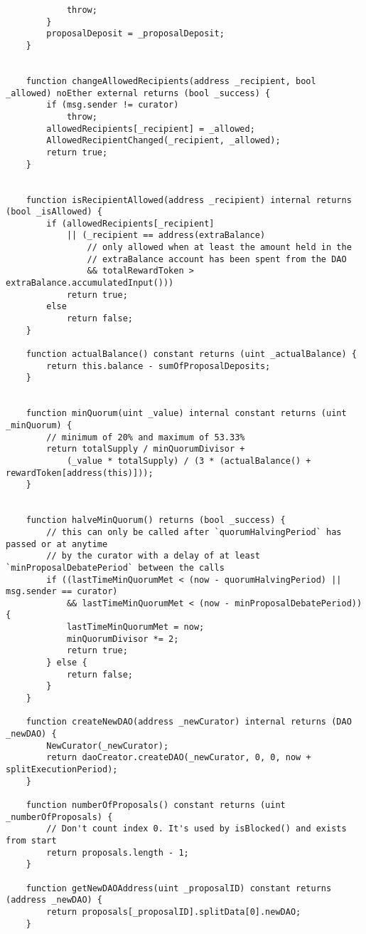 \documentclass[9pt,oneside]{amsart}
\begin{document}
\begin{appendix}
\begin{verbatim}
            throw;
        }
        proposalDeposit = _proposalDeposit;
    }


    function changeAllowedRecipients(address _recipient, bool _allowed) noEther external returns (bool _success) {
        if (msg.sender != curator)
            throw;
        allowedRecipients[_recipient] = _allowed;
        AllowedRecipientChanged(_recipient, _allowed);
        return true;
    }


    function isRecipientAllowed(address _recipient) internal returns (bool _isAllowed) {
        if (allowedRecipients[_recipient]
            || (_recipient == address(extraBalance)
                // only allowed when at least the amount held in the
                // extraBalance account has been spent from the DAO
                && totalRewardToken > extraBalance.accumulatedInput()))
            return true;
        else
            return false;
    }

    function actualBalance() constant returns (uint _actualBalance) {
        return this.balance - sumOfProposalDeposits;
    }


    function minQuorum(uint _value) internal constant returns (uint _minQuorum) {
        // minimum of 20% and maximum of 53.33%
        return totalSupply / minQuorumDivisor +
            (_value * totalSupply) / (3 * (actualBalance() + rewardToken[address(this)]));
    }


    function halveMinQuorum() returns (bool _success) {
        // this can only be called after `quorumHalvingPeriod` has passed or at anytime
        // by the curator with a delay of at least `minProposalDebatePeriod` between the calls
        if ((lastTimeMinQuorumMet < (now - quorumHalvingPeriod) || msg.sender == curator)
            && lastTimeMinQuorumMet < (now - minProposalDebatePeriod)) {
            lastTimeMinQuorumMet = now;
            minQuorumDivisor *= 2;
            return true;
        } else {
            return false;
        }
    }

    function createNewDAO(address _newCurator) internal returns (DAO _newDAO) {
        NewCurator(_newCurator);
        return daoCreator.createDAO(_newCurator, 0, 0, now + splitExecutionPeriod);
    }

    function numberOfProposals() constant returns (uint _numberOfProposals) {
        // Don't count index 0. It's used by isBlocked() and exists from start
        return proposals.length - 1;
    }

    function getNewDAOAddress(uint _proposalID) constant returns (address _newDAO) {
        return proposals[_proposalID].splitData[0].newDAO;
    }


\end{verbatim}
\end{appendix}
\end{document}

